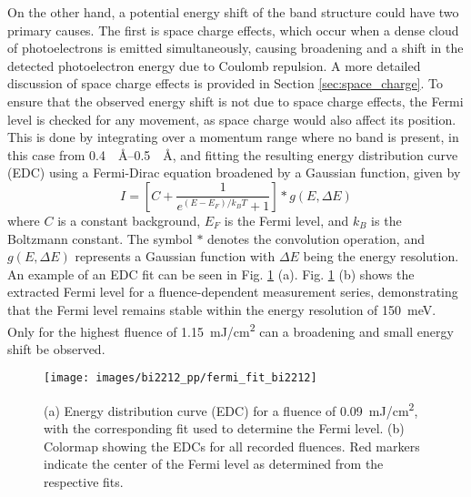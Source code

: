 On the other hand, a potential energy shift of the band structure could have two primary causes.
The first is space charge effects, which occur when a dense cloud of photoelectrons is emitted simultaneously, causing broadening and a shift in the detected photoelectron energy due to Coulomb repulsion.
A more detailed discussion of space charge effects is provided in Section \ref{sec:space_charge}.
To ensure that the observed energy shift is not due to space charge effects, the Fermi level is checked for any movement, as space charge would also affect its position.
This is done by integrating over a momentum range where no band is present, in this case from \qtyrange{0.4}{0.5}{\per\angstrom}, and fitting the resulting energy distribution curve (EDC) using a Fermi-Dirac equation broadened by a Gaussian function, given by
\begin{equation}
	I = \left[ C + \frac{1}{e^{(E-E_F)/k_BT}+1} \right] * g(E,\Delta E)
\end{equation}
where $C$ is a constant background, $E_F$ is the Fermi level, and $k_B$ is the Boltzmann constant.
The symbol $*$ denotes the convolution operation, and $g(E, \Delta E)$ represents a Gaussian function with $\Delta E$ being the energy resolution.
An example of an EDC fit can be seen in Fig. \ref{fig:fermi_fit_bi2212} (a).
Fig. \ref{fig:fermi_fit_bi2212} (b) shows the extracted Fermi level for a fluence-dependent measurement series, demonstrating that the Fermi level remains stable within the energy resolution of \qty{150}{\milli\electronvolt}.
Only for the highest fluence of \qty{1.15}{\milli\joule/\centi\meter\squared} can a broadening and small energy shift be observed.

\begin{figure}[t]
	\centering
	\texttt{[image: images/bi2212\_pp/fermi\_fit\_bi2212]}
	\caption{(a) Energy distribution curve (EDC) for a fluence of \qty{0.09}{\milli\joule/\centi\meter\squared}, with the corresponding fit used to determine the Fermi level. (b) Colormap showing the EDCs for all recorded fluences. Red markers indicate the center of the Fermi level as determined from the respective fits.}
	\label{fig:fermi_fit_bi2212}
\end{figure}

